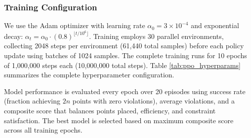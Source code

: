 \documentclass{article}
\theoremstyle{plain}
\theoremstyle{definition}
\theoremstyle{remark}
\begin{document}
\subsubsection{Training Configuration}

We use the Adam optimizer \cite{Kingma2015} with learning rate $\alpha_0 = 3 \times 10^{-4}$ and exponential decay: $\alpha_t = \alpha_0 \cdot (0.8)^{\lfloor t / 10^6 \rfloor}$. Training employs 30 parallel environments, collecting 2048 steps per environment (61,440 total samples) before each policy update using batches of 1024 samples. The complete training runs for 10 epochs of 1,000,000 steps each (10,000,000 total steps). Table \ref{tab:ppo_hyperparams} summarizes the complete hyperparameter configuration.

\begin{table}[htbp]
\vspace{0.1in}
\begin{center}
\begin{small}
\begin{sc}
\caption{PPO Hyperparameters}
\label{tab:ppo_hyperparams}
\end{sc}
\end{small}
\end{center}
\vspace{0.1in}
\end{table}

Model performance is evaluated every epoch over 20 episodes using success rate (fraction achieving $2n$ points with zero violations), average violations, and a composite score that balances points placed, efficiency, and constraint satisfaction. The best model is selected based on maximum composite score across all training epochs.
\end{document}
